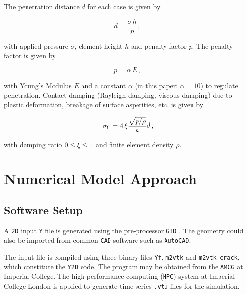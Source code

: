 \documentclass[format=acmtog,12pt,screen=true,review=false,natbib=false,]{acmart}
\begin{document}
\bigbreak
The penetration distance $d$ for each case is given by \cite{Mun04}

\begin{equation}
    \label{eq:d}
    d=\frac{\sigma\,h}{p}\,,
\end{equation}

with applied pressure $\sigma$, element height $h$ and penalty factor $p$. The penalty factor is given by

\begin{equation}
    \label{eq:p}
    p=\alpha\,E\,,
\end{equation}

with \rm{Young's Modulus} $E$ and a constant $\alpha$ (in this paper: $\alpha=10$) to regulate penetration. Contact damping (Rayleigh damping, viscous damping) due to plastic deformation, breakage of surface asperities, etc. is given by \cite{Mun04}

\begin{equation}
    \label{eq:sigmac}
    \sigma_{\rm{C}}=4\,\xi\frac{\sqrt{p/\rho}}{h}\dot{d}\,,
\end{equation}

\addtocounter{footnote}{-1}
with damping ratio $0\leq\xi\leq1$ and finite element density $\rho$.  


\section{Numerical Model Approach}
\label{sec:NumericalModelApproach}

\subsection{Software Setup}
\label{subsec:SoftwareSetup}

A \texttt{2D} input \texttt{Y} file is generated using the pre-processor \texttt{GID} \cite{GID11}. The geometry could also be imported from common \texttt{CAD} software such as \texttt{AutoCAD}.

\bigbreak
The input file is compiled using three binary files \texttt{Yf}, \texttt{m2vtk} and \texttt{m2vtk\_crack}, which constitute the \texttt{Y2D} code. The program may be obtained from the \texttt{AMCG} at Imperial College. The high performance computing (\texttt{HPC}) system at Imperial College London is applied to generate time series \texttt{.vtu} files for the simulation. 
\end{document}
